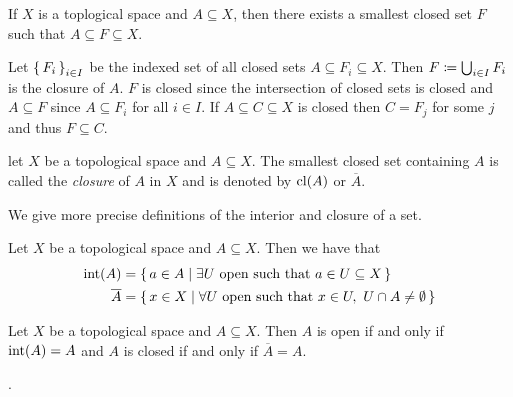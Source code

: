 \documentclass[letterpaper, 11pt, oneside]{book}
\begin{document}
\begin{prop}
  If $X$ is a toplogical space and $A \subseteq X$, then there exists a smallest closed set $F$ such that $A \subseteq F \subseteq X$.
\end{prop}
\begin{pf}
  Let $\set{F_{i}}_{i \in I}$ be the indexed set of all closed sets $A \subseteq F_{i} \subseteq X$.
  Then $F \coloneqq \bigcup_{i \in I} F_{i}$ is the closure of $A$.
  $F$ is closed since the intersection of closed sets is closed and $A \subseteq F$ since $A \subseteq F_{i}$ for all $i \in I$.
  If $A \subseteq C \subseteq X$ is closed then $C = F_{j}$ for some $j$ and thus $F \subseteq C$.
\end{pf}
\begin{defn}[Closure]
  let $X$ be a topological space and $A \subseteq X$.
  The smallest closed set containing $A$ is called the \emph{closure} of $A$ in $X$ and is denoted by $\operatorname{cl}(A)$ or $\overline{A}$.
\end{defn}

We give more precise definitions of the interior and closure of a set.

\begin{prop}\label{prop: defn_of_int_and_cl}
  Let $X$ be a topological space and $A \subseteq X$.
  Then we have that
  \begin{align*}
    \operatorname{int}(A) &= \set{a \in A | \exists U \text{ open such that } a \in U \subseteq X} \\
    \overline{A} &= \set{x \in X | \forall U \text{ open such that } x \in U,~ U \cap A \neq \emptyset}
  \end{align*}
\end{prop}
\begin{pf}
\end{pf}

\begin{prop}
  Let $X$ be a topological space and $A \subseteq X$.
  Then $A$ is open if and only if $\operatorname{int}(A) = A$ and $A$ is closed if and only if $\overline{A} = A$.
\end{prop}
\begin{pf}
  .
\end{pf}
\end{document}
